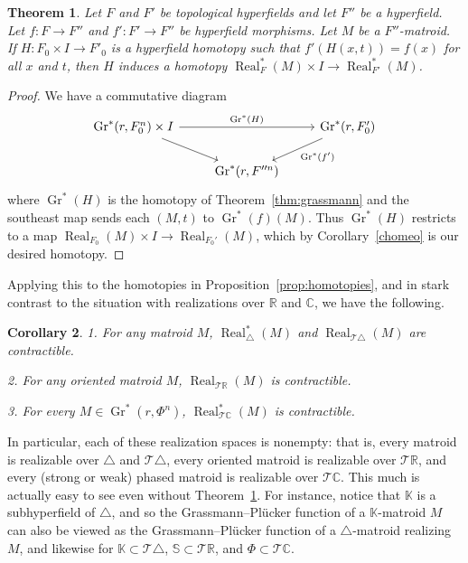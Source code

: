 \documentclass[10pt, preprint]{article}
\newtheorem{theorem}{Theorem}[section]
\newtheorem{corollary}[theorem]{Corollary}
\theoremstyle{definition}
\begin{document}
\begin{theorem}
\label{thm:realization}
Let $F$ and $F'$ be topological hyperfields and let $F''$ be a
hyperfield. Let $f:F\to F''$ and $f':F'\to F''$ be hyperfield morphisms.
Let $M$ be a $F''$-matroid. If $H: F_{0} \times I \to F'_{0}$ is a
hyperfield homotopy such that $f'(H(x,t))=f(x)$ for all $x$ and $t$,
then $H$ induces a homotopy $ \operatorname{Real}_{F}^{*}(M)\times I
\to \operatorname{Real}_{F'}^{*}(M)$.
\end{theorem}

\begin{proof}
We have a commutative diagram
%
\begin{equation}
%
\begin{tikzcd}
\operatorname{Gr} ^*(r, F_0^n)\times I\arrow[rr,"\operatorname{Gr} ^*(H)"]
\arrow[rd]&&\operatorname{Gr} ^*(r, F_0')\arrow[ld, "\operatorname{Gr} ^*(f')"]\\
&\operatorname{Gr} ^*(r,F''^n)&
\end{tikzcd}
%
\end{equation}
%
where $\operatorname{Gr}^{*}(H)$ is the homotopy of
Theorem~\ref{thm:grassmann} and the southeast map sends each
$(M,t)$ to $\operatorname{Gr}^{*}(f)(M)$. Thus
$\operatorname{Gr}^{*}(H)$ restricts to a map $\operatorname{Real}
_{F_{0}}(M)\times I \to \operatorname{Real}_{F_{0}'}(M)$, which by
Corollary~\ref{chomeo} is our desired homotopy.
\end{proof}

Applying this to the homotopies in Proposition~\ref{prop:homotopies},
and in stark contrast to the situation with realizations over
$\mathbb{R}$ and $\mathbb{C}$, we have the following.

\begin{corollary}
1. For any matroid $M$, $\operatorname{Real}_{ \triangle }^{*}(M)$ and
$\operatorname{Real}_{\mathcal{T }\triangle }(M)$ are contractible.

2. For any oriented matroid $M$, $\operatorname{Real}_{\mathcal{T }
\mathbb{R}}(M)$ is contractible.

3. For every $M\in \operatorname{Gr}^{*}(r,\Phi ^{n})$, $
\operatorname{Real}_{\mathcal{T }\mathbb{C}}^{*}(M)$ is contractible.
\end{corollary}

In particular, each of these realization spaces is nonempty: that is,
every matroid is realizable over $\triangle $ and $\mathcal{T }\triangle
$, every oriented matroid is realizable over $\mathcal{T }\mathbb{R}$,
and every (strong or weak) phased matroid is realizable over
$\mathcal{T }\mathbb{C}$. This much is actually easy to see even without
Theorem~\ref{thm:realization}. For instance, notice that $\mathbb{K}$
is a subhyperfield of $\triangle $, and so the Grassmann--Pl\"{u}cker
function of a $\mathbb{K}$-matroid $M$ can also be viewed as the
Grassmann--Pl\"{u}cker function of a $\triangle $-matroid realizing
$M$, and likewise for $\mathbb{K}\subset \mathcal{T }\triangle $,
$\mathbb{S}\subset \mathcal{T }\mathbb{R}$, and $\Phi \subset \mathcal{T
}\mathbb{C}$.
\end{document}
